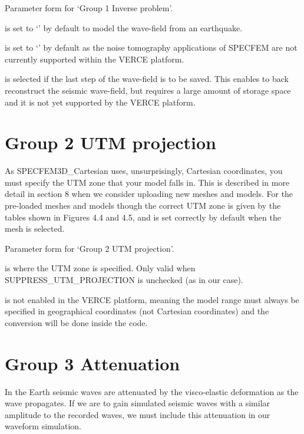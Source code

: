 \documentclass[english]{book}
\begin{document}

 Parameter form for ‘Group 1 \textendash{} Inverse problem’.

 is set to ‘’ by default to model the
wave-field from an earthquake.

 is set to ‘’ by default
as the noise tomography applications of SPECFEM are not currently
supported within the VERCE platform.

 is selected if the last step of the wave-field is to
be saved. This enables to back reconstruct the seismic wave-field, but
requires a large amount of storage space and it is not yet supported by
the VERCE platform.


\section{Group 2 \textendash{} UTM projection}
\label{\detokenize{Appendix1:a1-3-group-2-utm-projection}}
As SPECFEM3D\_Cartesian uses, unsurprisingly, Cartesian coordinates, you
must specify the UTM zone that your model falls in. This is described in
more detail in section 8 when we consider uploading new meshes and
models. For the pre-loaded meshes and models though the correct UTM zone
is given by the tables shown in Figures 4.4 and 4.5, and is set
correctly by default when the mesh is selected.


 Parameter form for ‘Group 2 \textendash{} UTM projection’.

 is where the UTM zone is specified. Only valid
when SUPPRESS\_UTM\_PROJECTION is unchecked (as in our case).

 is not enabled in the VERCE platform,
meaning the model range must always be specified in geographical
coordinates (not Cartesian coordinates) and the conversion will be done
inside the code.


\section{Group 3 \textendash{} Attenuation}
\label{\detokenize{Appendix1:a1-4-group-3-attenuation}}
In the Earth seismic waves are attenuated by the visco-elastic
deformation as the wave propagates. If we are to gain simulated seismic
waves with a similar amplitude to the recorded waves, we must include
this attenuation in our waveform simulation.
\end{document}

